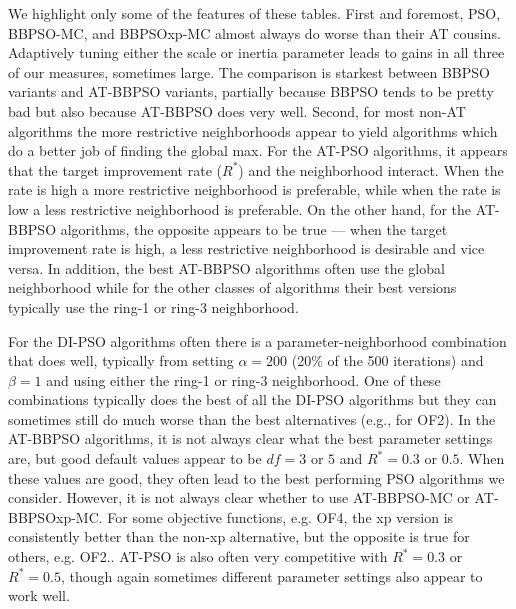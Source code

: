 \documentclass[cmbright]{staauth}
\begin{document}
We highlight only some of the features of these tables. First and foremost, PSO, BBPSO-MC, and BBPSOxp-MC almost always do worse than their AT cousins. Adaptively tuning either the scale or inertia parameter leads to gains in all three of our measures, sometimes large. The comparison is starkest between BBPSO variants and AT-BBPSO variants, partially because BBPSO tends to be pretty bad but also because AT-BBPSO does very well. Second, for most non-AT algorithms the more restrictive neighborhoods appear to yield algorithms which do a better job of finding the global max. For the AT-PSO algorithms, it appears that the target improvement rate ($R^*$) and the neighborhood interact. When the rate is high a more restrictive neighborhood is preferable, while when the rate is low a less restrictive neighborhood is preferable. On the other hand, for the AT-BBPSO algorithms, the opposite appears to be true --- when the target improvement rate is high, a less restrictive neighborhood is desirable and vice versa. In addition, the best AT-BBPSO algorithms often use the global neighborhood while for the other classes of algorithms their best versions typically use the ring-1 or ring-3 neighborhood.

For the DI-PSO algorithms often there is a parameter-neighborhood combination that does well, typically from setting $\alpha=200$ (20\% of the 500 iterations) and $\beta=1$ and using either the ring-1 or ring-3 neighborhood. One of these combinations typically does the best of all the DI-PSO algorithms but they can sometimes still do much worse than the best alternatives (e.g., for OF2). In the AT-BBPSO algorithms, it is not always clear what the best parameter settings are, but good default values appear to be $df=3$ or $5$ and $R^*=0.3$ or $0.5$. When these values are good, they often lead to the best performing PSO algorithms we consider. However, it is not always clear whether to use AT-BBPSO-MC or AT-BBPSOxp-MC. For some objective functions, e.g. OF4, the xp version is consistently better than the non-xp alternative, but the opposite is true for others, e.g. OF2.. AT-PSO is also often very competitive with $R^*=0.3$ or $R^*=0.5$, though again sometimes different parameter settings also appear to work well.
\end{document}
